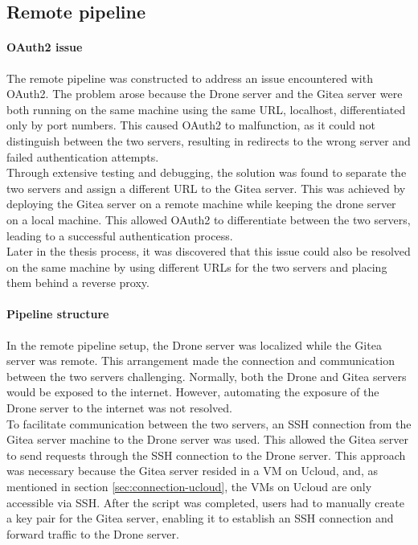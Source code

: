 \subsection{Remote pipeline}
\paragraph{OAuth2 issue}
The remote pipeline was constructed to address an issue encountered with OAuth2. 
The problem arose because the Drone server and the Gitea server were both running on the same machine using the same URL, 
localhost, differentiated only by port numbers. This caused OAuth2 to malfunction, as it could not distinguish between the two servers, 
resulting in redirects to the wrong server and failed authentication attempts.\\
Through extensive testing and debugging, the solution was found to separate the two servers and assign a 
different URL to the Gitea server. This was achieved by deploying the Gitea server on a remote machine while keeping the drone server 
on a local machine. This allowed OAuth2 to differentiate between the two servers, leading to a successful authentication process.\\
Later in the thesis process, it was discovered that this 
issue could also be resolved on the same machine by using different URLs for the two servers and placing them behind a reverse proxy.
\paragraph{Pipeline structure}
In the remote pipeline setup, the Drone server was localized while the Gitea server was remote. 
This arrangement made the connection and communication between the two servers challenging. 
Normally, both the Drone and Gitea servers would be exposed to the internet. 
However, automating the exposure of the Drone server to the internet was not resolved.\\
To facilitate communication between the two servers, an SSH connection from the Gitea server machine 
to the Drone server was used. This allowed the Gitea server to send  requests through 
the SSH connection to the Drone server. This approach was necessary because the Gitea server resided in a VM on \ac{Ucloud}, 
and, as mentioned in section \ref{sec:connection-ucloud}, the VMs on \ac{Ucloud} are only accessible via SSH.
After the  script was completed, users had to manually create a key pair for the Gitea server, 
enabling it to establish an SSH connection and forward traffic to the Drone server.

